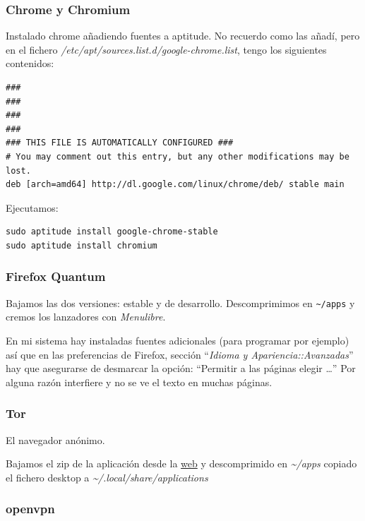 \documentclass[12pt,spanish,]{scrartcl}
\begin{document}
\hypertarget{chrome-y-chromium}{%
\subsubsection{Chrome y Chromium}\label{chrome-y-chromium}}

Instalado chrome añadiendo fuentes a aptitude. No recuerdo como las
añadí, pero en el fichero
\emph{/etc/apt/sources.list.d/google-chrome.list}, tengo los siguientes
contenidos:

\begin{verbatim}
###
###
###
###
### THIS FILE IS AUTOMATICALLY CONFIGURED ###
# You may comment out this entry, but any other modifications may be lost.
deb [arch=amd64] http://dl.google.com/linux/chrome/deb/ stable main
\end{verbatim}

Ejecutamos:

\begin{verbatim}
sudo aptitude install google-chrome-stable
sudo aptitude install chromium
\end{verbatim}

\hypertarget{firefox-quantum}{%
\subsubsection{Firefox Quantum}\label{firefox-quantum}}

Bajamos las dos versiones: estable y de desarrollo. Descomprimimos en
\texttt{\textasciitilde{}/apps} y cremos los lanzadores con
\emph{Menulibre}.

En mi sistema hay instaladas fuentes adicionales (para programar por
ejemplo) así que en las preferencias de Firefox, sección ``\emph{Idioma
y Apariencia::Avanzadas}'' hay que asegurarse de desmarcar la opción:
``Permitir a las páginas elegir \ldots{}'' Por alguna razón interfiere y
no se ve el texto en muchas páginas.

\hypertarget{tor}{%
\subsubsection{Tor}\label{tor}}

El navegador anónimo.

Bajamos el zip de la aplicación desde la
\href{https://www.torproject.org}{web} y descomprimido en
\emph{\textasciitilde{}/apps} copiado el fichero desktop a
\emph{\textasciitilde{}/.local/share/applications}

\hypertarget{openvpn}{%
\subsubsection{openvpn}\label{openvpn}}
\end{document}
